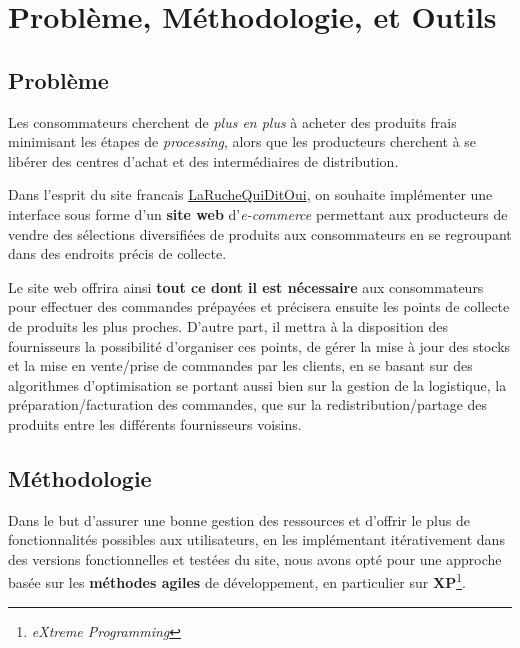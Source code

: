 \documentclass[a4paper,12pt]{report}
\theoremstyle{break}
\theoremstyle{break}
\theoremstyle{break}
\theoremstyle{break}
\theoremstyle{definition}
\theoremstyle{remark}
\begin{document}
\chapter{Problème, Méthodologie, et Outils}
\section{Problème}
Les consommateurs cherchent de \textit{plus en plus} à acheter des produits frais minimisant les étapes de \textit{processing}, alors que les producteurs cherchent à se libérer des centres d’achat et des intermédiaires de distribution.

Dans l’esprit du site francais \href{https://laruchequiditoui.fr/fr}{LaRucheQuiDitOui}, on souhaite implémenter une interface sous forme d'un \textbf{site web} d'\textit{e-commerce} permettant aux producteurs de vendre des sélections diversifiées de produits aux consommateurs en se regroupant dans des endroits précis de collecte.

Le site web offrira ainsi \textbf{tout ce dont il est nécessaire} aux consommateurs pour effectuer des commandes prépayées et précisera ensuite les points de collecte de produits les plus proches. D'autre part, il mettra à la disposition des fournisseurs la possibilité d'organiser ces points, de gérer la mise à jour des stocks et la mise en vente/prise de commandes par les clients, en se basant sur des algorithmes d'optimisation se portant aussi bien sur la gestion de la logistique, la préparation/facturation des commandes, que sur la redistribution/partage des produits entre les différents fournisseurs voisins.
\section{Méthodologie}
Dans le but d'assurer une bonne gestion des ressources et d'offrir le plus de fonctionnalités possibles aux utilisateurs, en les implémentant itérativement dans des versions fonctionnelles et testées du site, nous avons opté pour une approche basée sur les \textbf{méthodes agiles} de développement, en particulier sur \textbf{XP}\footnote{\textit{eXtreme Programming}}.
\end{document}
